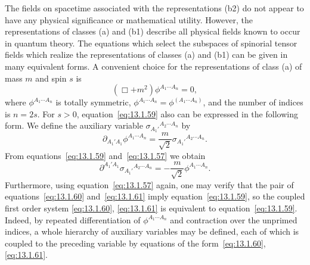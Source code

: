 The fields on spacetime associated with the representations (b2) do not appear to
have any physical significance or mathematical utility. However, the representations
of classes (a) and (b1) describe all physical fields known to occur in quantum
theory. The equations which select the subspaces of spinorial tensor fields which
realize the representations of classes (a) and (b1) can be given in many equivalent
forms. A convenient choice for the representations of class (a) of mass \(m\) and
spin \(s\) is
\begin{equation}
  \left(\Box+m^2\right)\phi^{A_1\cdots A_n}=0,
  \tag{13.1.59}\label{eq:13.1.59}
\end{equation}
where \(\phi^{A_1\cdots A_n}\) is totally symmetric,
\(\phi^{A_1\cdots A_n}=\phi^{(A_1\cdots A_n)}\), and the number of indices is
\(n=2s\). For \(s>0\), equation~\eqref{eq:13.1.59} also can be expressed in the
following form. We define the auxiliary variable
\(\sigma_{A_1'}{}^{A_2\cdots A_n}\) by
\begin{equation}
  \partial_{A_1'A_1}\phi^{A_1\cdots A_n}
  =\frac{m}{\sqrt2}\sigma_{A_1'}{}^{A_2\cdots A_n}.
  \tag{13.1.60}\label{eq:13.1.60}
\end{equation}
From equations~\eqref{eq:13.1.59} and~\eqref{eq:13.1.57} we obtain
\begin{equation}
  \partial^{A_1'A_1}\sigma_{A_1'}{}^{A_2\cdots A_n}
  =-\frac{m}{\sqrt2}\phi^{A_1\cdots A_n}.
  \tag{13.1.61}\label{eq:13.1.61}
\end{equation}
Furthermore, using equation~\eqref{eq:13.1.57} again, one may verify that the pair
of equations~\eqref{eq:13.1.60} and~\eqref{eq:13.1.61} imply
equation~\eqref{eq:13.1.59}, so the coupled first order system
\eqref{eq:13.1.60}, \eqref{eq:13.1.61} is equivalent to
equation~\eqref{eq:13.1.59}. Indeed, by repeated differentiation of
\(\phi^{A_1\cdots A_n}\) and contraction over the unprimed indices, a whole
hierarchy of auxiliary variables may be defined, each of which is coupled to the
preceding variable by equations of the form~\eqref{eq:13.1.60},
\eqref{eq:13.1.61}.

